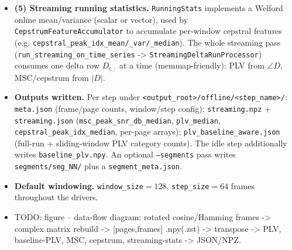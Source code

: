 \documentclass[conference]{IEEEtran}
\begin{document}
\begin{itemize}
        $\mathrm{irfft}\bigl(\log(|\mathrm{rfft}(|D|)| + \varepsilon)\bigr)$ and
        \texttt{compute\_cepstral\_peak} returns the dominant quefrency index
        $\arg\max_q |c_q|$ above \texttt{min\_quef\_idx} (default $10$ in the
        offline class).
  \item \textbf{(5) Streaming running statistics.} \texttt{RunningStats}
        implements a Welford online mean/variance (scalar or vector), used by
        \texttt{CepstrumFeatureAccumulator} to accumulate per-window cepstral
        features (e.g. \texttt{cepstral\_peak\_idx\_mean/\_var/\_median}). The
        whole streaming pass (\texttt{run\_streaming\_on\_time\_series} ->
        \texttt{StreamingDeltaRunProcessor}) consumes one delta row $D_{t,:}$ at
        a time (memmap-friendly): PLV from $\angle D$, MSC/cepstrum from $|D|$.
  \item \textbf{Outputs written.} Per step under
        \texttt{<output\_root>/offline/<step\_name>/}:
        \texttt{meta.json} (frame/page counts, window/step config);
        \texttt{streaming.npz} + \texttt{streaming.json}
        (\texttt{msc\_peak\_snr\_db\_median}, \texttt{plv\_median},
        \texttt{cepstral\_peak\_idx\_median}, per-page arrays);
        \texttt{plv\_baseline\_aware.json} (full-run + sliding-window PLV
        category counts). The idle step additionally writes
        \texttt{baseline\_plv.npy}. An optional \texttt{--segments} pass writes
        \texttt{segments/seg\_NN/} plus a \texttt{segment\_meta.json}.
  \item \textbf{Default windowing.} \texttt{window\_size}$=128$,
        \texttt{step\_size}$=64$ frames throughout the drivers.
  \item TODO: figure -- data-flow diagram: rotated cosine/Hamming frames ->
        complex matrix rebuild -> [pages,frames] .npy(.zst) -> transpose ->
        {PLV, baseline-PLV, MSC, cepstrum, streaming-stats} -> JSON/NPZ.
\end{itemize}
\end{document}
